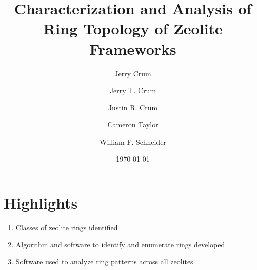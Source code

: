\documentclass{elsarticle}
\author{Jerry Crum}
\date{\today}
\title{}
\begin{document}
\begin{OPTIONS:}
\end{OPTIONS:}

\title{Characterization and Analysis of Ring Topology of Zeolite Frameworks}
\author[nd]{Jerry T. Crum}
\author[uoa]{Justin R. Crum}
\author[nd]{Cameron Taylor}
\author[nd,ndc]{William F. Schneider}
\address[nd]{Department of Chemical and Biomoledcular Engineering, University of Notre Dame, 250 Nieuwland Science Hall, Notre Dame, IN 46556, USA}
\address[uoa]{Department of Applied Mathematics, University of Arizona, 617 N Santa Rita Ave, Tucson, AZ 85721, USA}
\address[ndc]{Department of Chemistry and Biochemistry, University of Notre Dame, 251 Nieuwland Science Hall, Notre Dame, IN 46556, USA}
\maketitle

\section{Highlights}
\label{sec:orgcf997d0}
\begin{enumerate}
\item Classes of zeolite rings identified
\item Algorithm and software to identify and enumerate rings developed
\item Software used to analyze ring patterns across all zeolites
\end{enumerate}
\end{document}
